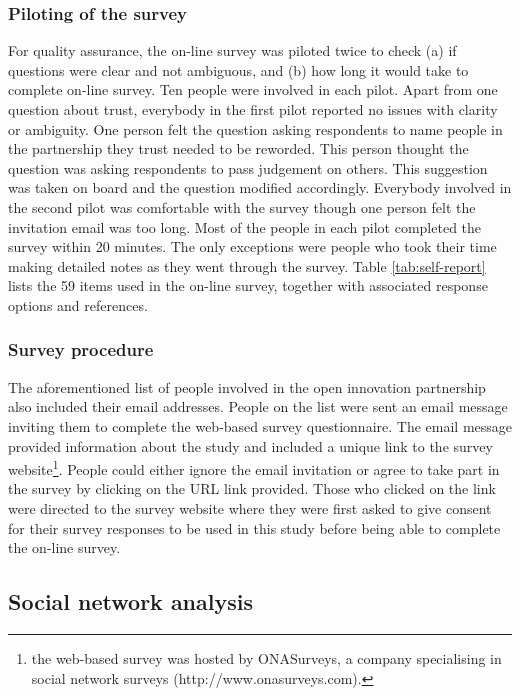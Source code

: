 \subsubsection{Piloting of the survey}

For quality assurance, the on-line survey was piloted twice to check (a) if questions were clear and not ambiguous, and (b) how long it would take to complete on-line survey. Ten people were involved in each pilot. Apart from one question about trust, everybody in the first pilot reported no issues with clarity or ambiguity. One person felt the question asking respondents to name people in the partnership they trust needed to be reworded. This person thought the question was asking respondents to pass judgement on others. This suggestion was taken on board and the question modified accordingly. Everybody involved in the second pilot was comfortable with the survey though one person felt the invitation email was too long. Most of the people in each pilot completed the survey within 20 minutes. The only exceptions were people who took their time making detailed notes as they went through the survey. Table \ref{tab:self-report} lists the 59 items used in the on-line survey, together with associated response options and references.\medskip  

\subsubsection{Survey procedure}

The aforementioned list of people involved in the open innovation partnership also included their email addresses. People on the list were sent an email message inviting them to complete the web-based survey questionnaire. The email message provided information about the study and included a unique link to the survey website\footnote{the web-based survey was hosted by ONASurveys, a company specialising in social network surveys (http://www.onasurveys.com).}. People could either ignore the email invitation or agree to take part in the survey by clicking on the URL link provided. Those who clicked on the link were directed to the survey website where they were first asked to give consent for their survey responses to be used in this study before being able to complete the on-line survey.\medskip

\subsection{Social network analysis}

